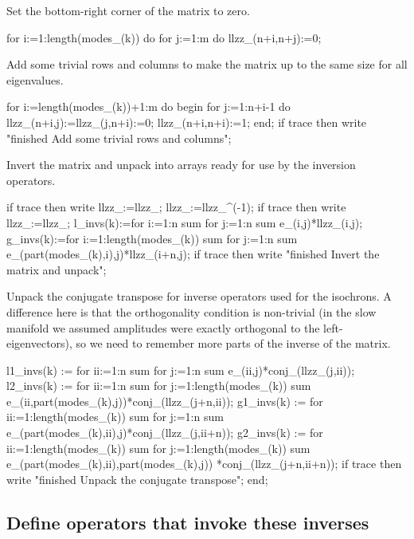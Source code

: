 \documentclass[11pt,a5paper]{article}
\begin{document}
Set the bottom-right corner of the matrix to zero.
\begin{reduce}
  for i:=1:length(modes_(k)) do 
    for j:=1:m do llzz_(n+i,n+j):=0;
\end{reduce}

Add some trivial rows and columns to make the matrix up to
the same size for all eigenvalues.
\begin{reduce}
  for i:=length(modes_(k))+1:m do begin 
    for j:=1:n+i-1 do llzz_(n+i,j):=llzz_(j,n+i):=0;
    llzz_(n+i,n+i):=1;
  end;
  if trace then write "finished Add some trivial rows and columns";
\end{reduce}

Invert the matrix and unpack into arrays ready for use by
the inversion operators.
\begin{reduce}
  if trace then write llzz_:=llzz_; 
  llzz_:=llzz_^(-1);
  if trace then write llzz_:=llzz_;
  l_invs(k):=for i:=1:n sum for j:=1:n sum e_(i,j)*llzz_(i,j);
  g_invs(k):=for i:=1:length(modes_(k)) sum 
    for j:=1:n sum e_(part(modes_(k),i),j)*llzz_(i+n,j);
if trace then write "finished Invert the matrix and unpack";
\end{reduce}

Unpack the conjugate transpose for inverse operators used
for the isochrons. A difference here is that the
orthogonality condition is non-trivial (in the slow manifold
we assumed amplitudes were exactly orthogonal to the
left-eigenvectors), so we need to remember more parts of the
inverse of the matrix.  
\begin{reduce}
  l1_invs(k) := for ii:=1:n sum for j:=1:n sum 
      e_(ii,j)*conj_(llzz_(j,ii));
  l2_invs(k) := for ii:=1:n sum 
      for j:=1:length(modes_(k)) sum 
          e_(ii,part(modes_(k),j))*conj_(llzz_(j+n,ii));
  g1_invs(k) := for ii:=1:length(modes_(k)) sum 
      for j:=1:n sum 
          e_(part(modes_(k),ii),j)*conj_(llzz_(j,ii+n));
  g2_invs(k) := for ii:=1:length(modes_(k)) sum 
      for j:=1:length(modes_(k)) sum 
          e_(part(modes_(k),ii),part(modes_(k),j))
          *conj_(llzz_(j+n,ii+n));
  if trace then write "finished Unpack the conjugate transpose";
end;
\end{reduce}



\subsection{Define operators that invoke these inverses}
\end{document}
